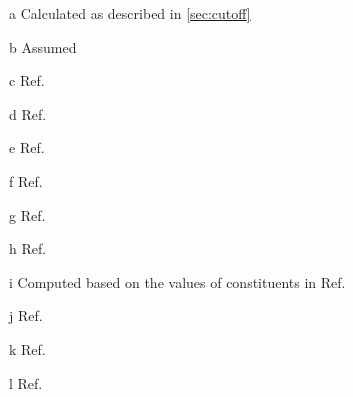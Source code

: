 \begin{table}[!htbp]
\begin{threeparttable}

        \medskip
        \vspace{-2.6229525pt}
        \begin{tablenotes}
            \begin{scriptsize}
            \item[a] Calculated as described in \cref{sec:cutoff}
            \item[b] Assumed
            \item[c] Ref.~\cite{Sae2010}
            \item[d] Ref.~\cite{Kizilel2009, Lu2013}
            \item[e] Ref.~\cite{GMBoltBatteryDims}
		    \item[f] Ref.~\cite{Groger2015}
            \item[g] Ref.~\cite{Svens2013}
            \item[h] Ref.~\cite{Chen2005}
            \item[i] Computed based on the values of constituents in Ref.~\cite{martienssen2006springer}
            \item[j] Ref.~\cite{martienssen2006springer}
            \item[k] Ref.~\cite{Jeon2011}
            \item[l] Ref.~\cite{Guo2010}

\end{scriptsize}
\end{tablenotes}
\end{threeparttable}
\end{table}
